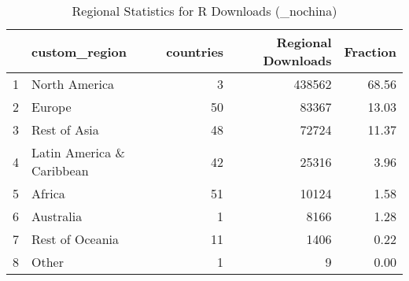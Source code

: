 \begin{table}[ht]
\centering
\begin{tabular}{rlrrr}
  \hline
 & custom\_region & countries & Regional Downloads & Fraction \\ 
  \hline
1 & North America &   3 & 438562 & 68.56 \\ 
  2 & Europe &  50 & 83367 & 13.03 \\ 
  3 & Rest of Asia &  48 & 72724 & 11.37 \\ 
  4 & Latin America \& Caribbean &  42 & 25316 & 3.96 \\ 
  5 & Africa &  51 & 10124 & 1.58 \\ 
  6 & Australia &   1 & 8166 & 1.28 \\ 
  7 & Rest of Oceania &  11 & 1406 & 0.22 \\ 
  8 & Other &   1 &   9 & 0.00 \\ 
   \hline
\end{tabular}
\caption{Regional Statistics for R Downloads (_nochina)} 
\label{tab:r_downloads_regional_stats_select_nochina}
\end{table}
